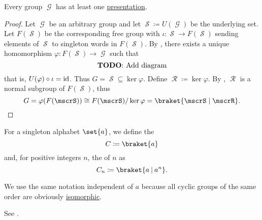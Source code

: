 \begin{theorem}\label{thm:every_group_is_representable}
  Every group \( \mscrG \) has at least one \hyperref[def:group_presentation]{presentation}.
\end{theorem}
\begin{proof}
  Let \( \mscrG \) be an arbitrary group and let \( \mscrS \coloneqq U(\mscrG) \) be the underlying set. Let \( F(\mscrS) \) be the corresponding free group with \( \iota: \mscrS \to F(\mscrS) \) sending elements of \( \mscrS \) to singleton words in \( F(\mscrS) \). By , there exists a unique homomorphism \( \varphi: F(\mscrS) \to \mscrG \) such that
  \begin{equation*}
    \text{\todo{Add diagram}}\iffalse\begin{mplibcode}
      beginfig(1);
      input metapost/graphs;

      v1 := thelabel("$\mscrS$", origin);
      v2 := thelabel("$U(F(\mscrS))$", (-1, -1) scaled u);
      v3 := thelabel("$U(G)$", (1, -1) scaled u);

      a1 := straight_arc(v1, v2);
      a2 := straight_arc(v1, v3);

      d1 := straight_arc(v2, v3);

      draw_vertices(v);
      draw_arcs(a);

      drawarrow d1 dotted;

      label.ulft("$\iota$", straight_arc_midpoint of a1);
      label.urt("$\id$", straight_arc_midpoint of a2);
      label.top("$U(\varphi)$", straight_arc_midpoint of d1);
      endfig;
    \end{mplibcode}\fi
  \end{equation*}
  that is, \( U(\varphi) \circ \iota = \operatorname{id} \). Thus \( G = \mscrS \subseteq \ker \varphi \). Define \( \mscrR \coloneqq \ker \varphi \). By , \( \mscrR \) is a normal subgroup of \( F(\mscrS) \), thus
  \begin{equation*}
    G = \varphi(F(\mscrS)) \cong F(\mscrS) / \ker \varphi = \braket{ \mscrS \mid \mscrR }.
  \end{equation*}
\end{proof}

\begin{definition}\label{def:cyclic_group}
  For a singleton alphabet \( \set{ a } \), we define the 
  \begin{equation*}
    C \coloneqq \braket{a}
  \end{equation*}
  and, for positive integers \( n \), the  of  \( n \) as
  \begin{equation*}
    C_n \coloneqq \braket{a \given a^n}.
  \end{equation*}

  We use the same notation independent of \( a \) because all cyclic groups of the same order are obviously \hyperref[def:group/homomorphism]{isomorphic}.

  See .
\end{definition}

